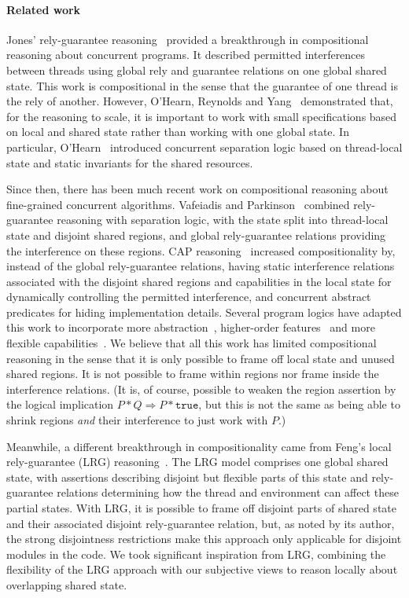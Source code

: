 \paragraph{Related work}
Jones' rely-guarantee reasoning~\cite{rg} provided a breakthrough in
compositional reasoning about concurrent programs. It described
permitted interferences between threads using global rely and
guarantee relations on one  global shared state. This work is
compositional in the sense that the guarantee of one thread is the
rely of another. However, O'Hearn, Reynolds and
Yang~\cite{o2001local} demonstrated that, for the
reasoning to scale, it is important to work with small specifications
based on local and shared state rather than working with one
global state. In particular, O'Hearn~\cite{csl-tcs} introduced concurrent
separation logic based on thread-local state and static invariants for
the shared resources.

Since then, there has been much recent work on compositional
reasoning about fine-grained concurrent algorithms. Vafeiadis and
Parkinson~\cite{viktor-marriage} combined rely-guarantee reasoning with
separation logic, with the state split into thread-local state and
disjoint shared regions, and global rely-guarantee relations providing
the interference on these regions. 
CAP reasoning~\cite{cap-ecoop10} increased  compositionality by, instead of the
global
rely-guarantee relations, having static interference relations
associated with the disjoint shared regions and capabilities in the local
state for dynamically controlling the permitted  interference, and concurrent
abstract predicates for hiding implementation details. Several
program logics have adapted this work to incorporate more
abstraction~\cite{caresl}, higher-order features~\cite{icap} and more flexible
capabilities~\cite{tada}. We believe that all  this work has  limited compositional
reasoning in the sense that it is only possible to frame off local
state and unused shared regions. It is not possible to 
frame within regions nor frame inside the interference
relations.  (It is, of course, possible to weaken the region assertion
by the logical implication $P * Q \Rightarrow P * \texttt{true}$, but this is
not the same as being able to shrink regions \emph{and} their interference to
just work with $P$.) 

Meanwhile, a different breakthrough in compositionality came from
Feng's local rely-guarantee (LRG) reasoning~\cite{lrg}. The LRG model
comprises one global shared state, with assertions describing
{disjoint} but flexible parts of this state and rely-guarantee
relations determining how the thread and environment can affect these
partial states. With LRG, it is possible to frame off disjoint parts of
shared state and their associated disjoint rely-guarantee relation, but, as noted
by its author, the strong disjointness restrictions make this approach
only applicable for disjoint modules in the code. We took significant
inspiration from LRG, combining the flexibility of the LRG approach
with our subjective views to reason locally about overlapping shared
state.

